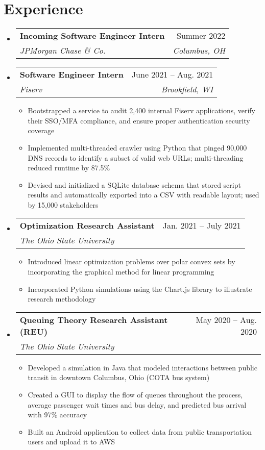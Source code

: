 \documentclass[letterpaper,11pt]{article}
\makeatletter
\newcommand{\resumeItem}[1]{
  \item\small{
    {#1 \vspace{-2pt}}
  }
}
\newcommand{\resumeSubheading}[4]{
  \vspace{-2pt}\item
    \begin{tabular*}{0.97\textwidth}[t]{l@{\extracolsep{\fill}}r}
      \textbf{#1} & #2 \\
      \textit{\small#3} & \textit{\small #4} \\
    \end{tabular*}\vspace{-7pt}
}
\newcommand{\resumeSubHeadingListStart}{\begin{itemize}[leftmargin=0.15in, label={}]}
\newcommand{\resumeSubHeadingListEnd}{\end{itemize}}
\newcommand{\resumeItemListStart}{\begin{itemize}}
\newcommand{\resumeItemListEnd}{\end{itemize}\vspace{-5pt}}
\makeatother
\begin{document}
\section{Experience}
  \resumeSubHeadingListStart

    \resumeSubheading
      {Incoming Software Engineer Intern}{Summer 2022}
      {JPMorgan Chase \& Co.}{Columbus, OH}
      \resumeItemListStart
        \resumeItemListEnd
        \vspace{.1cm}
    \resumeSubheading
      {Software Engineer Intern}{June 2021 -- Aug. 2021}
      {Fiserv}{Brookfield, WI}
      \resumeItemListStart
        \resumeItem{Bootstrapped a service to audit 2,400 internal Fiserv applications, verify their SSO/MFA compliance, and ensure proper authentication security coverage}
        \resumeItem{Implemented multi-threaded crawler using Python that pinged 90,000 DNS records to identify a subset of valid web URLs; multi-threading reduced runtime by 87.5\%}
        \resumeItem{Devised and initialized a SQLite database schema that stored script results and automatically exported into a CSV with readable layout; used by 15,000 stakeholders}
        \resumeItemListEnd

    \resumeSubheading
      {Optimization Research Assistant}{Jan. 2021 -- July 2021}
      {The Ohio State University}{}
      \resumeItemListStart
        \resumeItem{Introduced linear optimization problems over polar convex sets by incorporating the graphical method for linear programming}
        \resumeItem{Incorporated Python simulations using the Chart.js library to illustrate research methodology}
      \resumeItemListEnd
      
      \resumeSubheading
      {Queuing Theory Research Assistant (REU)}{May 2020 -- Aug. 2020}
      {The Ohio State University}{}
      \resumeItemListStart
        \resumeItem{Developed a simulation in Java that modeled interactions between public transit in downtown Columbus, Ohio (COTA bus system)}
        \resumeItem{Created a GUI to display the flow of queues throughout the process, average passenger wait times and bus delay, and predicted bus arrival with 97\% accuracy}
        \resumeItem{Built an Android application to collect data from public transportation users and upload it to AWS}
      \resumeItemListEnd
  \resumeSubHeadingListEnd


\end{document}
